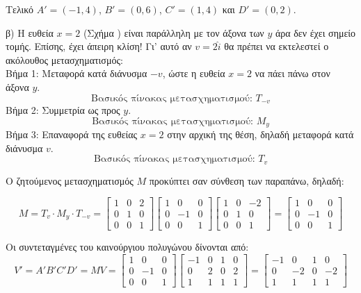 \begin{solution}
Τελικό $A' = (-1, 4)$, $B' = (0, 6)$, $C' = (1, 4)$ και $D' = (0, 2)$.

β) Η ευθεία $x=2$ (Σχήμα ) είναι παράλληλη με τον άξονα των $y$ άρα δεν έχει σημείο τομής. Επίσης, έχει άπειρη κλίση! Γι' αυτό αν $v = 2\hat{i}$ θα πρέπει να εκτελεστεί ο ακόλουθος μετασχηματισμός:\\
Βήμα 1: Μεταφορά κατά διάνυσμα $-v$, ώστε η ευθεία $x=2$ να πάει πάνω στον άξονα $y$.
\[
\text{Βασικός πίνακας μετασχηματισμού: } T_{-v}
\]
Βήμα 2: Συμμετρία ως προς $y$.
\[
\text{Βασικός πίνακας μετασχηματισμού: } M_y
\]
Βήμα 3: Επαναφορά της ευθείας $x=2$ στην αρχική της θέση, δηλαδή μεταφορά κατά διάνυσμα $v$.
\[
\text{Βασικός πίνακας μετασχηματισμού: } T_v
\]

Ο ζητούμενος μετασχηματισμός $M$ προκύπτει σαν σύνθεση των παραπάνω, δηλαδή:

\[
M = T_v \cdot M_y \cdot T_{-v} = \begin{bmatrix}
1 & 0 & 2 \\
0 & 1 & 0 \\
0 & 0 & 1
\end{bmatrix}
\begin{bmatrix}
1 & 0 & 0 \\
0 & -1 & 0 \\
0 & 0 & 1
\end{bmatrix}
\begin{bmatrix}
1 & 0 & -2 \\
0 & 1 & 0 \\
0 & 0 & 1
\end{bmatrix} = \begin{bmatrix}
1 & 0 & 0 \\
0 & -1 & 0 \\
0 & 0 & 1
\end{bmatrix}
\]

Οι συντεταγμένες του καινούργιου πολυγώνου δίνονται από:
\[
V' = A'B'C'D' = MV = \begin{bmatrix}
1 & 0 & 0 \\
0 & -1 & 0 \\
0 & 0 & 1
\end{bmatrix}
\begin{bmatrix}
-1 & 0 & 1 & 0 \\
0 & 2 & 0 & 2 \\
1 & 1 & 1 & 1
\end{bmatrix} = \begin{bmatrix}
-1 & 0 & 1 & 0 \\
0 & -2 & 0 & -2 \\
1 & 1 & 1 & 1
\end{bmatrix}
\]


\end{solution}

